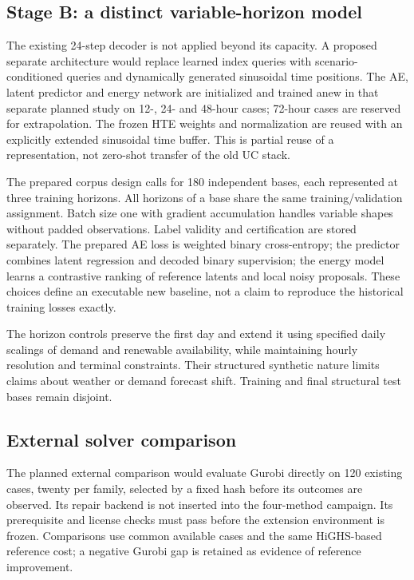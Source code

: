 \subsection{Stage B: a distinct variable-horizon model}
The existing 24-step decoder is not applied beyond its capacity. A proposed separate
architecture would replace learned index queries with scenario-conditioned queries
and dynamically generated sinusoidal time positions. The AE, latent predictor
and energy network are initialized and trained anew in that separate planned study on 12-, 24- and 48-hour
cases; 72-hour cases are reserved for extrapolation. The frozen HTE weights
and normalization are reused with an explicitly extended sinusoidal time buffer.
This is partial reuse of a representation, not zero-shot transfer of the old
UC stack.

The prepared corpus design calls for 180 independent bases, each represented at three
training horizons. All horizons of a base share the same training/validation
assignment. Batch size one with gradient accumulation handles variable shapes
without padded observations. Label validity and certification are stored
separately. The prepared AE loss is weighted binary cross-entropy; the predictor
combines latent regression and decoded binary supervision; the energy model
learns a contrastive ranking of reference latents and local noisy proposals.
These choices define an executable new baseline, not a claim to reproduce the
historical training losses exactly.

The horizon controls preserve the first day and extend it using specified daily
scalings of demand and renewable availability, while maintaining hourly
resolution and terminal constraints. Their structured synthetic nature limits
claims about weather or demand forecast shift. Training and final structural
test bases remain disjoint.

\subsection{External solver comparison}
The planned external comparison would evaluate Gurobi directly on 120 existing cases, twenty per family, selected
by a fixed hash before its outcomes are observed. Its repair backend is not
inserted into the four-method campaign. Its prerequisite and license checks
must pass before the extension environment is frozen. Comparisons use common
available cases and the same HiGHS-based reference cost; a negative Gurobi gap
is retained as evidence of reference improvement.

